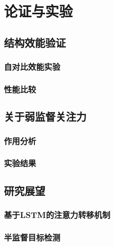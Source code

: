 \chapter{论证与实验}
\label{cha:exp}

\section{结构效能验证}
\label{sec:ablation}
\subsection{自对比效能实验}
\label{subsec:selfeval}
\subsection{性能比较}
\label{subsec:perf}

\section{关于弱监督关注力}
\label{sec:weaksuperatten}
\subsection{作用分析}
\label{subsec:attenstudy}
\subsection{实验结果}
\label{subsec:attenexp}

\section{研究展望}
\label{sec:future}
\subsection{基于LSTM的注意力转移机制}
\label{subsec:lstmatten}
\subsection{半监督目标检测}
\label{subsec:semisuperdetect}